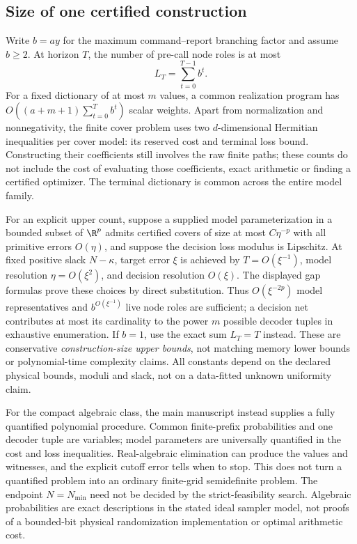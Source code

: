 \subsection{Size of one certified construction}
Write $b=ay$ for the maximum command--report branching factor and assume $b\ge2$. At horizon $T$, the number of pre-call node roles is at most
\[
 L_T=\sum_{t=0}^{T-1}b^t.
\]
For a fixed dictionary of at most $m$ values, a common realization program has $O((a+m+1)\sum_{t=0}^T b^t)$ scalar weights. Apart from normalization and nonnegativity, the finite cover problem uses two $d$-dimensional Hermitian inequalities per cover model: its reserved cost and terminal loss bound. Constructing their coefficients still involves the raw finite paths; these counts do not include the cost of evaluating those coefficients, exact arithmetic or finding a certified optimizer. The terminal dictionary is common across the entire model family.

For an explicit upper count, suppose a supplied model parameterization in a bounded subset of $\R^p$ admits certified covers of size at most $C\eta^{-p}$ with all primitive errors $O(\eta)$, and suppose the decision loss modulus is Lipschitz. At fixed positive slack $N-\kappa$, target error $\xi$ is achieved by $T=O(\xi^{-1})$, model resolution $\eta=O(\xi^2)$, and decision resolution $O(\xi)$. The displayed gap formulas prove these choices by direct substitution. Thus $O(\xi^{-2p})$ model representatives and $b^{O(\xi^{-1})}$ live node roles are sufficient; a decision net contributes at most its cardinality to the power $m$ possible decoder tuples in exhaustive enumeration. If $b=1$, use the exact sum $L_T=T$ instead. These are conservative \emph{construction-size upper bounds}, not matching memory lower bounds or polynomial-time complexity claims. All constants depend on the declared physical bounds, moduli and slack, not on a data-fitted unknown uniformity claim.

For the compact algebraic class, the main manuscript instead supplies a fully quantified polynomial procedure. Common finite-prefix probabilities and one decoder tuple are variables; model parameters are universally quantified in the cost and loss inequalities. Real-algebraic elimination can produce the values and witnesses, and the explicit cutoff error tells when to stop. This does not turn a quantified problem into an ordinary finite-grid semidefinite problem. The endpoint $N=N_{\min}$ need not be decided by the strict-feasibility search. Algebraic probabilities are exact descriptions in the stated ideal sampler model, not proofs of a bounded-bit physical randomization implementation or optimal arithmetic cost.


